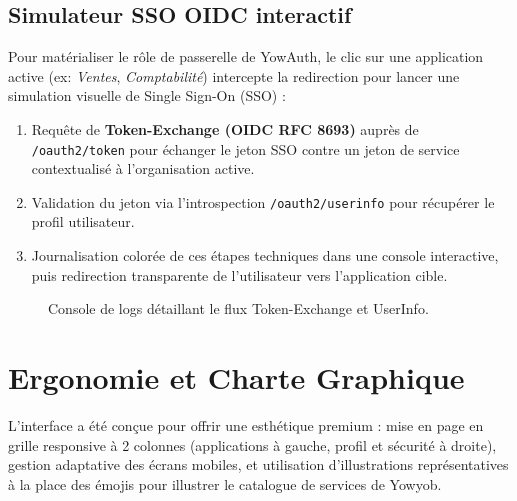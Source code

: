 \documentclass[11pt,a4paper,oneside]{report}
\newcommand{\code}[1]{\texttt{\small #1}}
\begin{document}
\subsection{Simulateur SSO OIDC interactif}
Pour matérialiser le rôle de passerelle de YowAuth, le clic sur une application active (ex: \emph{Ventes}, \emph{Comptabilité}) intercepte la redirection pour lancer une simulation visuelle de Single Sign-On (SSO) :
\begin{enumerate}
  \item Requête de \textbf{Token-Exchange (OIDC RFC 8693)} auprès de \code{/oauth2/token} pour échanger le jeton SSO contre un jeton de service contextualisé à l'organisation active.
  \item Validation du jeton via l'introspection \code{/oauth2/userinfo} pour récupérer le profil utilisateur.
  \item Journalisation colorée de ces étapes techniques dans une console interactive, puis redirection transparente de l'utilisateur vers l'application cible.
\end{enumerate}

\begin{figure}[h]
  \centering
  \caption{Console de logs détaillant le flux Token-Exchange et UserInfo.}
  \label{fig:poc-sso-modal}
\end{figure}

\section{Ergonomie et Charte Graphique}
L'interface a été conçue pour offrir une esthétique premium : mise en page en grille responsive à 2 colonnes (applications à gauche, profil et sécurité à droite), gestion adaptative des écrans mobiles, et utilisation d'illustrations représentatives à la place des émojis pour illustrer le catalogue de services de Yowyob.

\end{document}
